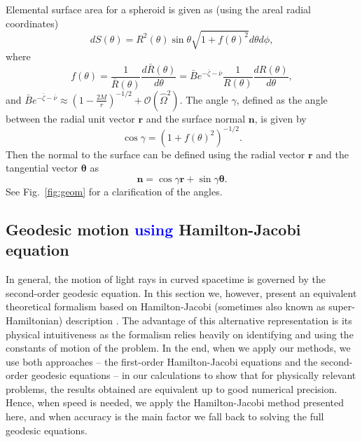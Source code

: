 \documentclass{aa}
\newcommand{\be}{\begin{equation}}
\newcommand{\ee}{\end{equation}}
\renewcommand{\vec}[1]{\ensuremath{\boldsymbol{#1}}}
\newcommand{\refe}[1]{\textcolor{blue}{{#1}}}
\newcommand{\Ob}{\ensuremath{\hat{\Omega}}}
\newcommand{\nub}{\ensuremath{\bar{\nu}}}
\newcommand{\zetab}{\ensuremath{\bar{\zeta}}}
\newcommand{\Bb}{\ensuremath{\bar{B}}}
\begin{document}
Elemental surface area for a spheroid is given as (using the areal radial coordinates)
\be
dS(\theta) = R^2(\theta) \sin\theta \sqrt{1 + f(\theta)^2}d\theta d\phi,
\ee
where
\be
f(\theta) = \frac{1}{\bar{R}(\theta)} \frac{d \bar{R}(\theta)}{d \theta} 
= \Bb e^{-\zetab-\nub} \frac{1}{R(\theta)} \frac{dR(\theta)}{d\theta}, 
\ee
and $\Bb e^{-\zetab-\nub} \approx \left(1-\frac{2 M}{r}\right)^{-1/2} + \mathcal{O}(\Ob^2)$.
The angle $\gamma$, defined as the angle between the radial unit vector $\vec{r}$ and the surface normal $\vec{n}$, is given by
\be
\cos\gamma = \left(1 + f(\theta)^2\right)^{-1/2}.
\ee
Then the normal to the surface can be defined using the radial vector $\vec{r}$ and the tangential vector $\vec{\theta}$ as
\be\label{eq:surf_norm}
\vec{n} = \cos\gamma \vec{r} + \sin\gamma \vec{\theta}.
\ee
See Fig.~\ref{fig:geom} for a clarification of the angles.



\subsection{Geodesic motion \refe{using} Hamilton-Jacobi equation}\label{sect:hamjac}
In general, the motion of light rays in curved spacetime is governed by the second-order geodesic equation.
In this section we, however, present an equivalent theoretical formalism based on Hamilton-Jacobi (sometimes also known as super-Hamiltonian) description \citep{MTW73, cha}.
The advantage of this alternative representation is its physical intuitiveness as the formalism relies heavily on identifying and using the constants of motion of the problem.
In the end, when we apply our methods, we use both approaches -- the first-order Hamilton-Jacobi equations and the second-order geodesic equations -- in our calculations to show that for physically relevant problems, the results obtained are equivalent up to good numerical precision.
Hence, when speed is needed, we apply the Hamilton-Jacobi method presented here, and when accuracy is the main factor we fall back to solving the full geodesic equations.
\end{document}
